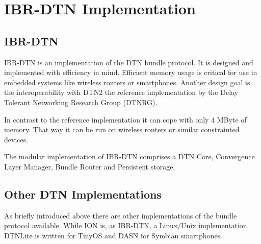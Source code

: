 \chapter{IBR-DTN Implementation}
\section{IBR-DTN}

IBR-DTN is an implementation of the DTN bundle protocol. It is designed and
implemented with efficiency in mind. Efficient memory usage is critical for
use in embedded systems like wireless routers or smartphones. Another design
goal is the interoperability with DTN2 the reference implementation by the Delay
Tolerant Networking Research Group (DTNRG).

In contrast to the reference implementation it can cope with only 4 MByte of
memory. That way it can be run on wireless routers or similar constrainted
devices.

The modular implementation of IBR-DTN comprises a DTN Core, Convergence Layer
Manager, Bundle Router and Persistent storage.

\section{Other DTN Implementations}

As briefly introduced above there are other implementations of the bundle
protocol available. While ION is, as IBR-DTN, a Linux/Unix implementation
DTNLite is written for TinyOS and DASN for Symbian smartphones.
